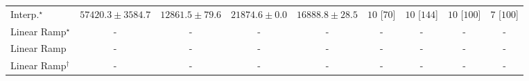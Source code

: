 \begin{tabular}{l|cccc|cccc|}
Interp.$^\star$ & {\cellcolor[HTML]{A43904}} \color[HTML]{F1F1F1} $57420.3\pm 3584.7$ & {\cellcolor[HTML]{FFFCD6}} \color[HTML]{000000} $12861.5\pm 79.6$ & {\cellcolor[HTML]{FEEAA0}} \color[HTML]{000000} $21874.6\pm 0.0$ & {\cellcolor[HTML]{FFF7BE}} \color[HTML]{000000} $16888.8\pm 28.5$ & {\cellcolor[HTML]{49006A}} \color[HTML]{F1F1F1} $10$ [$70$] & {\cellcolor[HTML]{49006A}} \color[HTML]{F1F1F1} $10$ [$144$] & {\cellcolor[HTML]{49006A}} \color[HTML]{F1F1F1} $10$ [$100$] & {\cellcolor[HTML]{CD238F}} \color[HTML]{F1F1F1} $7$ [$100$] \\
Linear Ramp$^\star$ & {\cellcolor[HTML]{000000}} \color[HTML]{F1F1F1} {\cellcolor{white}} \color{black} - & {\cellcolor[HTML]{000000}} \color[HTML]{F1F1F1} {\cellcolor{white}} \color{black} - & {\cellcolor[HTML]{000000}} \color[HTML]{F1F1F1} {\cellcolor{white}} \color{black} - & {\cellcolor[HTML]{000000}} \color[HTML]{F1F1F1} {\cellcolor{white}} \color{black} - & {\cellcolor[HTML]{000000}} \color[HTML]{F1F1F1} {\cellcolor{white}} \color{black} - & {\cellcolor[HTML]{000000}} \color[HTML]{F1F1F1} {\cellcolor{white}} \color{black} - & {\cellcolor[HTML]{000000}} \color[HTML]{F1F1F1} {\cellcolor{white}} \color{black} - & {\cellcolor[HTML]{000000}} \color[HTML]{F1F1F1} {\cellcolor{white}} \color{black} - \\
Linear Ramp & {\cellcolor[HTML]{000000}} \color[HTML]{F1F1F1} {\cellcolor{white}} \color{black} - & {\cellcolor[HTML]{000000}} \color[HTML]{F1F1F1} {\cellcolor{white}} \color{black} - & {\cellcolor[HTML]{000000}} \color[HTML]{F1F1F1} {\cellcolor{white}} \color{black} - & {\cellcolor[HTML]{000000}} \color[HTML]{F1F1F1} {\cellcolor{white}} \color{black} - & {\cellcolor[HTML]{000000}} \color[HTML]{F1F1F1} {\cellcolor{white}} \color{black} - & {\cellcolor[HTML]{000000}} \color[HTML]{F1F1F1} {\cellcolor{white}} \color{black} - & {\cellcolor[HTML]{000000}} \color[HTML]{F1F1F1} {\cellcolor{white}} \color{black} - & {\cellcolor[HTML]{000000}} \color[HTML]{F1F1F1} {\cellcolor{white}} \color{black} - \\
Linear Ramp$^\dagger$ & {\cellcolor[HTML]{000000}} \color[HTML]{F1F1F1} {\cellcolor{white}} \color{black} - & {\cellcolor[HTML]{000000}} \color[HTML]{F1F1F1} {\cellcolor{white}} \color{black} - & {\cellcolor[HTML]{000000}} \color[HTML]{F1F1F1} {\cellcolor{white}} \color{black} - & {\cellcolor[HTML]{000000}} \color[HTML]{F1F1F1} {\cellcolor{white}} \color{black} - & {\cellcolor[HTML]{000000}} \color[HTML]{F1F1F1} {\cellcolor{white}} \color{black} - & {\cellcolor[HTML]{000000}} \color[HTML]{F1F1F1} {\cellcolor{white}} \color{black} - & {\cellcolor[HTML]{000000}} \color[HTML]{F1F1F1} {\cellcolor{white}} \color{black} - & {\cellcolor[HTML]{000000}} \color[HTML]{F1F1F1} {\cellcolor{white}} \color{black} - \\

\end{tabular}
